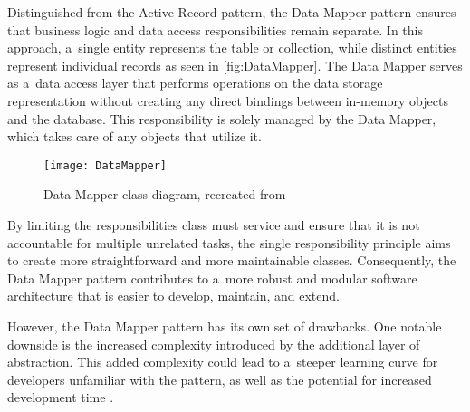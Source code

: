 Distinguished from the Active Record pattern, the Data Mapper pattern ensures
that business logic and data access responsibilities remain separate. In this
approach, a~single entity represents the table or collection, while distinct
entities represent individual records as seen in \autoref{fig:DataMapper}. The Data Mapper serves as a~data access
layer that performs operations on the data storage representation without
creating any direct bindings between in-memory objects and the database. This
responsibility is solely managed by the Data Mapper, which takes care of any
objects that utilize it.

\begin{figure}[tb]
    \caption[Data Mapper class diagram]{Data Mapper class diagram, recreated from \cite{fowler-patterns-2003}}
    \label{fig:DataMapper}
    \centering
    \texttt{[image: DataMapper]}
\end{figure}

By limiting the responsibilities class must service and ensure that it is not
accountable for multiple unrelated tasks, the single responsibility principle
aims to create more straightforward and more maintainable classes. Consequently,
the Data Mapper pattern contributes to a~more robust and modular software
architecture that is easier to develop, maintain, and extend.

However, the Data Mapper pattern has its own set of drawbacks. One notable
downside is the increased complexity introduced by the additional layer of
abstraction. This added complexity could lead to a~steeper learning curve for
developers unfamiliar with the pattern, as well as the potential for increased
development time \cite{David_2018}. 
